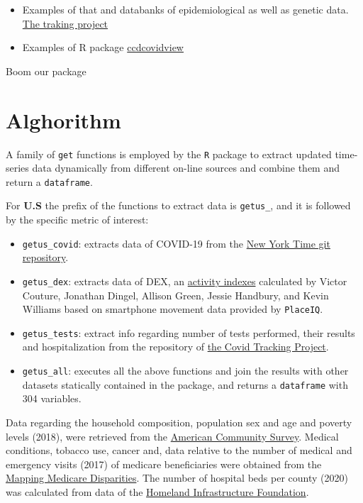 \documentclass[12pt,halfline,a4paper,]{ouparticle}
\providecommand{\tightlist}{%
  \setlength{\itemsep}{0pt}\setlength{\parskip}{0pt}}
\begin{document}
\begin{itemize}
\item
  Examples of that and databanks of epidemiological as well as genetic
  data. \href{https://covidtracking.com/}{The traking project}
\item
  Examples of R package
  \href{https://feedly.com/i/entry/bdiQAD3fuPUMyDNqrmPKRt6BvYW45zeCOcg+AUEj5wM=_1716a5b8395:28a35fb:7f4666f4}{ccdcovidview}
\end{itemize}

Boom our package

\hypertarget{alghorithm}{%
\section{Alghorithm}\label{alghorithm}}

A family of \texttt{get} functions is employed by the \texttt{R} package
to extract updated time-series data dynamically from different on-line
sources and combine them and return a \texttt{dataframe}.

For \textbf{U.S} the prefix of the functions to extract data is
\texttt{getus\_}, and it is followed by the specific metric of interest:

\begin{itemize}
\tightlist
\item
  \texttt{getus\_covid}: extracts data of COVID-19 from the
  \href{https://github.com/nytimes/covid-19-data}{New York Time git
  repository}.
\item
  \texttt{getus\_dex}: extracts data of DEX, an
  \href{https://github.com/COVIDExposureIndices/COVIDExposureIndices}{activity
  indexes} calculated by Victor Couture, Jonathan Dingel, Allison Green,
  Jessie Handbury, and Kevin Williams based on smartphone movement data
  provided by \texttt{PlaceIQ}.
\item
  \texttt{getus\_tests}: extract info regarding number of tests
  performed, their results and hospitalization from the repository of
  \href{https://covidtracking.com/api\%7D}{the Covid Tracking Project}.
\item
  \texttt{getus\_all}: executes all the above functions and join the
  results with other datasets statically contained in the package, and
  returns a \texttt{dataframe} with 304 variables.
\end{itemize}

Data regarding the household composition, population sex and age and
poverty levels (2018), were retrieved from the
\href{https://data.census.gov/cedsci/table?q=United\%20States}{American
Community Survey}. Medical conditions, tobacco use, cancer and, data
relative to the number of medical and emergency visits (2017) of
medicare beneficiaries were obtained from the
\href{https://data.cms.gov/mapping-medicare-disparities}{Mapping
Medicare Disparities}. The number of hospital beds per county (2020) was
calculated from data of the
\href{https://hifld-geoplatform.opendata.arcgis.com/datasets/hospitals/data?page=18}{Homeland
Infrastructure Foundation}.
\end{document}
